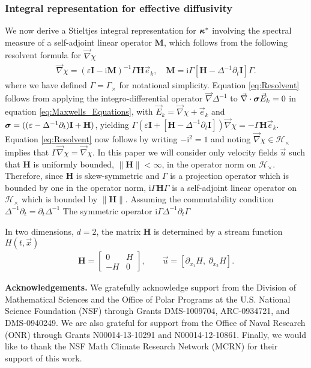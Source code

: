 \documentclass[11pt]{amsart}
\newcommand{\I}{\mathrm{i}}
\newcommand{\Mb}{\mathbf{M}}
\newcommand{\Hb}{\mathbf{H}}
\newcommand{\Ib}{\mathbf{I}}
\newcommand\bsig{\mbox{\boldmath${\sigma}$}}
\newcommand\bkappa{\mbox{\boldmath${\kappa}$}}
\begin{document}
\subsubsection{Integral representation for effective
  diffusivity}\label{sec:Integral_Rep}
%
We now derive a Stieltjes integral representation for $\bkappa^*$
involving the spectral measure of a self-adjoint linear operator
$\Mb$, which follows from the following resolvent formula for
$\vec{\nabla}\chi$  
%
\begin{align}\label{eq:Resolvent}
  \vec{\nabla}\chi=(\varepsilon\Ib-\I\Mb)^{-1}\Gamma\Hb\vec{e}_k, \quad
  \Mb=\I\Gamma[\Hb-\Delta^{-1}\partial_t\Ib]\Gamma.
\end{align}
%
where we have defined $\Gamma=\Gamma_\times$ for notational simplicity. Equation
\eqref{eq:Resolvent} follows from applying the integro-differential
operator $\vec{\nabla}\Delta^{-1}$ to $\vec{\nabla}\cdot\bsig\vec{E}_k=0$ in equation 
\eqref{eq:Maxwells_Equations}, with $\vec{E}_k=\vec{\nabla}\chi+\vec{e}_k$ and
$\bsig=((\varepsilon-\Delta^{-1}\partial_t)\Ib+\Hb)$, yielding
$\Gamma(\varepsilon\Ib+[\Hb-\Delta^{-1}\partial_t\Ib])\vec{\nabla}\chi=-\Gamma\Hb\vec{e}_k$. Equation
\eqref{eq:Resolvent} now follows by writing $-\I^2=1$ and noting 
$\vec{\nabla}\chi\in\mathscr{H}_\times$ implies that $\Gamma\vec{\nabla}\chi=\vec{\nabla}\chi$. In this paper
we will consider only velocity fields $\vec{u}$ such that $\Hb$ is
uniformly bounded, $\|\Hb\|<\infty$, in the operator norm on
$\mathscr{H}_\times$. Therefore, since $\Hb$ is skew-symmetric and $\Gamma$ is a
projection operator which is bounded by one in the operator norm,
$\I\Gamma\Hb\Gamma$ is a self-adjoint linear operator on $\mathscr{H}_\times$ which
is bounded by $\|\Hb\|$. Assuming the commutability condition $\Delta^{-1}\partial_t=\partial_t\Delta^{-1}$ The symmetric operator $\I\Gamma\Delta^{-1}\partial_t\Gamma$






In two dimensions, $d=2$, the matrix $\Hb$ is determined by a stream
function $H(t,\vec{x})$ 
%
\begin{align}\label{eq:u_H}  
  \Hb=\left[
  \begin{array}{cc}
    0  & H\\
    -H & 0
  \end{array}
  \right],
  \qquad
  \vec{u}=[\partial_{x_1}H, \ \partial_{x_2}H].
\end{align}
%

\newpage





\medskip

{\bf Acknowledgements.}
We gratefully acknowledge support from the Division of Mathematical
Sciences and the Office of Polar Programs at the U.S. 
National Science Foundation (NSF) through Grants
DMS-1009704, ARC-0934721, and DMS-0940249. We are also grateful for 
support from the Office of Naval Research (ONR) through
Grants N00014-13-10291 and N00014-12-10861. Finally, we would like to 
thank the NSF Math Climate Research Network (MCRN) for their support
of this work. 


\medskip



\end{document}
